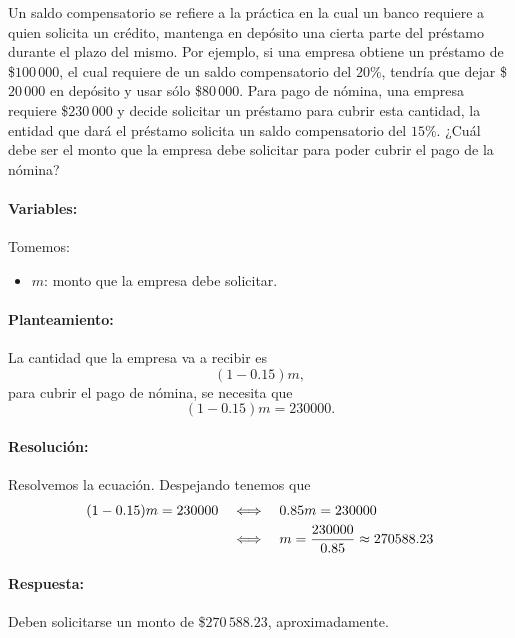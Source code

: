 \documentclass[10pt,respuestas,a4]{aleph-examen}
\begin{document}
\begin{preguntas}
\item
    Un saldo compensatorio se refiere a la práctica en la cual un banco requiere a quien solicita un crédito, mantenga en depósito una cierta parte del préstamo durante el plazo del mismo. Por ejemplo, si una empresa obtiene un préstamo de \$$100\,000$, el cual requiere de un saldo compensatorio del $20$\%, tendría que dejar \$$20\,000$ en depósito y usar sólo \$$80\,000$. Para pago de nómina, una empresa requiere \$$230\,000$ y decide solicitar un préstamo para cubrir esta cantidad, la entidad que dará el préstamo solicita un saldo compensatorio del $15$\%. ¿Cuál debe ser el monto que la empresa debe solicitar para poder cubrir el pago de la nómina?
    
\begin{respuesta}\hspace{0pt}
    \paragraph{Variables:} Tomemos:
    \begin{itemize}
        \item $m$: monto que la empresa debe solicitar.
    \end{itemize}
    \paragraph{Planteamiento:} La cantidad que la empresa va a recibir es
    \[
        (1 - 0.15)m,
    \]
    para cubrir el pago de nómina, se necesita que
    \[
        (1 - 0.15)m = 230000.
    \]
        
    \paragraph{Resolución:} Resolvemos la ecuación. Despejando tenemos que
    \begin{align*}
       (1 - 0.15)m = 230000
       &\quad\Longleftrightarrow\quad 0.85m = 230000 \\
       &\quad\Longleftrightarrow\quad m = \frac{230000}{0.85} \approx 270588.23
    \end{align*}
    
    \paragraph{Respuesta:} Deben solicitarse un monto de \$$270\,588.23$, aproximadamente.
\end{respuesta}

\end{preguntas}
\end{document}
